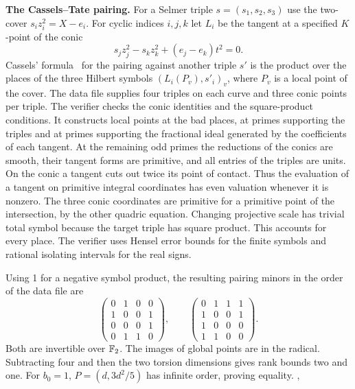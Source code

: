 \textbf{The Cassels--Tate pairing.} For a Selmer triple \(s=(s_1,s_2,s_3)\)
use the two-cover \(s_i z_i^2=X-e_i\). For cyclic indices \(i,j,k\)
let \(L_i\) be the tangent at a specified \(K\)-point of the conic
\[s_j z_j^2-s_k z_k^2+(e_j-e_k)t^2=0 .\]
Cassels' formula~\cite{FisherPair} for the pairing against another triple \(s'\) is the
product over the places of the three Hilbert symbols
\((L_i(P_v),s'_i)_v\), where \(P_v\) is a local point of the cover.
The data file supplies four triples on each curve and three conic
points per triple. The verifier checks the conic identities and the
square-product conditions. It constructs local points at the bad
places, at primes supporting the triples and at primes supporting the
fractional ideal generated by the coefficients of each tangent.
At the remaining odd primes the reductions of the conics are smooth,
their tangent forms are primitive, and all entries of the triples
are units. On the conic a tangent cuts out twice its point of contact.
Thus the evaluation of a tangent on primitive integral coordinates
has even valuation whenever it is nonzero. The three conic coordinates
are primitive for a primitive point of the intersection, by the other
quadric equation. Changing projective scale has trivial total symbol
because the target triple has square product. This accounts for every
place. The verifier uses Hensel error bounds for the finite symbols
and rational isolating intervals for the real signs.

Using 1 for a negative symbol product, the resulting pairing minors
in the order of the data file are
\[\begin{pmatrix}0&1&0&0\\1&0&0&1\\0&0&0&1\\0&1&1&0\end{pmatrix},
 \qquad
 \begin{pmatrix}0&1&1&1\\1&0&0&1\\1&0&0&0\\1&1&0&0\end{pmatrix}.\]
Both are invertible over \(\mathbb F_2\). The images of global points
are in the radical. Subtracting four and then the two torsion
dimensions gives rank bounds two and one. For \(b_0=1\),
\(P=(d,3d^2/5)\) has infinite order, proving equality.
,

